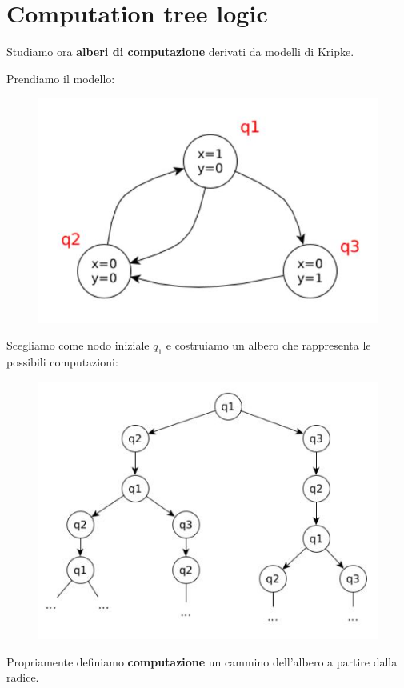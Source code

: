 \documentclass[a4paper,12pt, oneside]{book}
\begin{document}
\section{Computation tree logic}
Studiamo ora \textbf{alberi di computazione} derivati da modelli di Kripke.
\begin{esempio}
  Prendiamo il modello:
  \begin{figure}[H]
    \centering
    \includegraphics[scale = 0.4]{img/kri.jpg}
  \end{figure}
  Scegliamo come nodo iniziale $q_1$ e costruiamo un albero che rappresenta le
  possibili computazioni:
  \begin{figure}[H]
    \centering
    \includegraphics[scale = 0.4]{img/mc4.jpg}
  \end{figure}
\end{esempio}
\begin{definizione}
  Propriamente definiamo \textbf{computazione} un cammino dell'albero a partire
  dalla radice.
\end{definizione}
\end{document}
